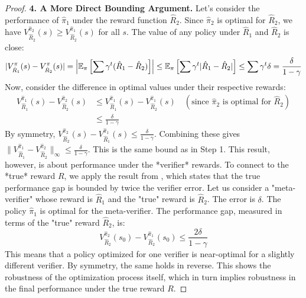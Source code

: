 \begin{proof}
\noindent\textbf{4. A More Direct Bounding Argument.}
Let's consider the performance of $\hat{\pi}_1$ under the reward function $\hat{R}_2$. Since $\hat{\pi}_2$ is optimal for $\hat{R}_2$, we have $V^{\hat{\pi}_2}_{\hat{R}_2}(s) \ge V^{\hat{\pi}_1}_{\hat{R}_2}(s)$ for all $s$.
The value of any policy under $\hat{R}_1$ and $\hat{R}_2$ is close:
\[ |V^{\pi}_{\hat{R}_1}(s) - V^{\pi}_{\hat{R}_2}(s)| = \left| \mathbb{E}_{\pi}\left[\sum \gamma^t (\hat{R}_1 - \hat{R}_2)\right] \right| \le \mathbb{E}_{\pi}\left[\sum \gamma^t |\hat{R}_1 - \hat{R}_2|\right] \le \sum \gamma^t \delta = \frac{\delta}{1-\gamma} \]
Now, consider the difference in optimal values under their respective rewards:
\begin{align*}
V^{\hat{\pi}_1}_{\hat{R}_1}(s) - V^{\hat{\pi}_2}_{\hat{R}_2}(s) &\le V^{\hat{\pi}_1}_{\hat{R}_1}(s) - V^{\hat{\pi}_1}_{\hat{R}_2}(s) \quad (\text{since } \hat{\pi}_2 \text{ is optimal for } \hat{R}_2) \\
&\le \frac{\delta}{1-\gamma}
\end{align*}
By symmetry, $V^{\hat{\pi}_2}_{\hat{R}_2}(s) - V^{\hat{\pi}_1}_{\hat{R}_1}(s) \le \frac{\delta}{1-\gamma}$. Combining these gives $\|V^{\hat{\pi}_1}_{\hat{R}_1} - V^{\hat{\pi}_2}_{\hat{R}_2}\|_{\infty} \le \frac{\delta}{1-\gamma}$. This is the same bound as in Step 1.
This result, however, is about performance under the *verifier* rewards. To connect to the *true* reward $R$, we apply the result from , which states that the true performance gap is bounded by twice the verifier error.
Let us consider a "meta-verifier" whose reward is $\hat{R}_1$ and the "true" reward is $\hat{R}_2$. The error is $\delta$. The policy $\hat{\pi}_1$ is optimal for the meta-verifier. The performance gap, measured in terms of the "true" reward $\hat{R}_2$, is:
\[ V^{\hat{\pi}_2}_{\hat{R}_2}(s_0) - V^{\hat{\pi}_1}_{\hat{R}_2}(s_0) \le \frac{2\delta}{1-\gamma} \]
This means that a policy optimized for one verifier is near-optimal for a slightly different verifier. By symmetry, the same holds in reverse. This shows the robustness of the optimization process itself, which in turn implies robustness in the final performance under the true reward $R$.
\end{proof}

